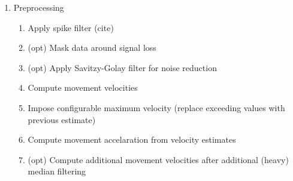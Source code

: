 \begin{enumerate}
  \item Preprocessing
    \begin{enumerate}
      \item Apply spike filter (cite)
      \item (opt) Mask data around signal loss
      \item (opt) Apply Savitzy-Golay filter for noise reduction
      \item Compute movement velocities
      \item Impose configurable maximum velocity (replace exceeding values with previous estimate)
      \item Compute movement accelaration from velocity estimates
      \item (opt) Compute additional movement velocities after additional (heavy) median filtering


\end{enumerate}
\end{enumerate}
